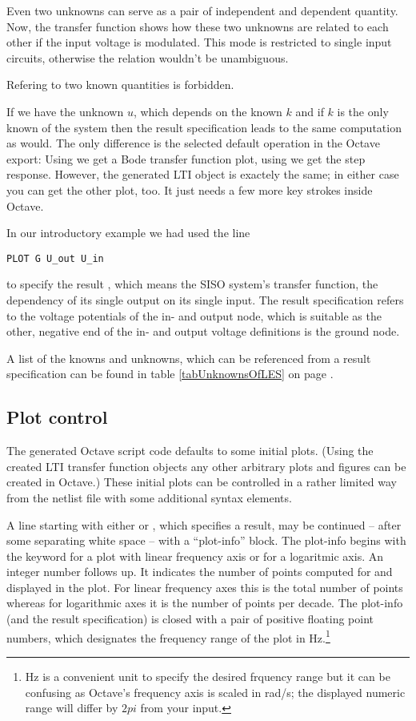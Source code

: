Even two unknowns can serve as a pair of independent and dependent
quantity. Now, the transfer function shows how these two unknowns are
related to each other if the input voltage is modulated. This mode is
restricted to single input circuits, otherwise the relation wouldn't be
unambiguous.

Refering to two known quantities is forbidden.

If we have the unknown $u$, which depends on the known $k$ and if
$k$ is the only known of the system then the result specification
 leads to the same computation as 
would. The only difference is the selected default operation in the Octave
export: Using  we get a Bode transfer function plot, using
 we get the step response. However, the generated LTI object is
exactely the same; in either case you can get the other plot, too. It just
needs a few more key strokes inside Octave.

In our introductory example we had used the line

\begin{verbatim}
PLOT G U_out U_in
\end{verbatim}

\noindent
to specify the result , which means the SISO system's transfer
function, the dependency of its single output on its single input. The
result specification refers to the voltage potentials of the in- and
output node, which is suitable as the other, negative end of the in- and
output voltage definitions is the ground node.

A list of the knowns and unknowns, which can be referenced from a
 result specification can be found in table
\ref{tabUnknownsOfLES} on page \pageref{tabUnknownsOfLES}.


\subsection{Plot control}

The generated Octave script code defaults to some initial plots. (Using
the created LTI transfer function objects any other arbitrary plots and
figures can be created in Octave.) These initial plots can be controlled
in a rather limited way from the netlist file with some additional syntax
elements.

A line starting with either  or , which specifies a
result, may be continued -- after some separating white space -- with a
``plot-info'' block. The plot-info begins with the keyword  for
a plot with linear frequency axis or  for a logaritmic axis. An
integer number follows up. It indicates the number of points computed for
and displayed in the plot. For linear frequency axes this is the total
number of points whereas for logarithmic axes it is the number of points
per decade. The plot-info (and the result specification) is closed with a
pair of positive floating point numbers, which designates the frequency
range of the plot in Hz.\footnote{Hz is a convenient unit to specify the
desired frquency range but it can be confusing as Octave's frequency axis
is scaled in rad/s; the displayed numeric range will differ by $2 pi$ from
your input.}

